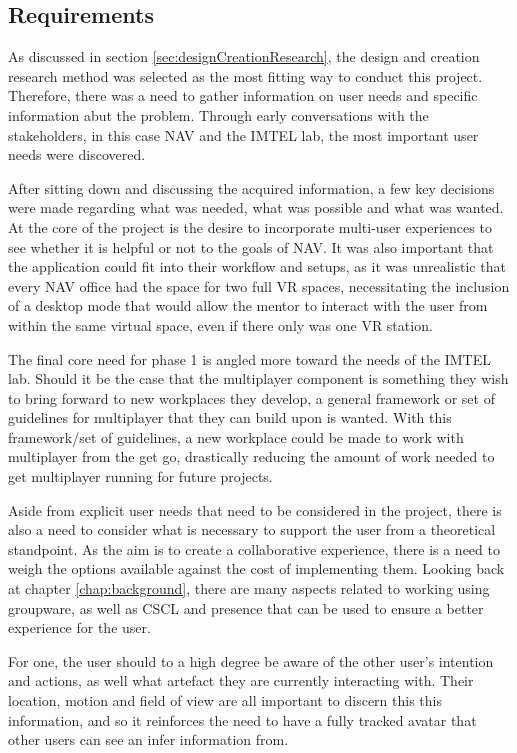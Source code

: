 \subsection{Requirements}
\label{section:phase1Requirements}
As discussed in section \ref{sec:designCreationResearch}, the design and creation research method was selected as the most fitting way to conduct this project. Therefore, there was a need to gather information on user needs and specific information abut the problem. Through early conversations with the stakeholders, in this case NAV and the IMTEL lab, the most important user needs were discovered. 

After sitting down and discussing the acquired information, a few key decisions were made regarding what was needed, what was possible and what was wanted.  At the core of the project is the desire to incorporate multi-user experiences to see whether it is helpful or not to the goals of NAV. It was also important that the application could fit into their workflow and setups, as it was unrealistic that every NAV office had the space for two full VR spaces, necessitating the inclusion of a desktop mode that would allow the mentor to interact with the user from within the same virtual space, even if there only was one VR station. 

The final core need for phase 1 is angled more toward the needs of the IMTEL lab. Should it be the case that the multiplayer component is something they wish to bring forward to new workplaces they develop, a general framework or set of guidelines for multiplayer that they can build upon is wanted. With this framework/set of guidelines, a new workplace could be made to work with multiplayer from the get go, drastically reducing the amount of work needed to get multiplayer running for future projects.

Aside from explicit user needs that need to be considered in the project, there is also a need to consider what is necessary to support the user from a theoretical standpoint. As the aim is to create a collaborative experience, there is a need to weigh the options available against the cost of implementing them. Looking back at chapter \ref{chap:background}, there are many aspects related to working using groupware, as well as CSCL and presence that can be used to ensure a better experience for the user.

For one, the user should to a high degree be aware of the other user's intention and actions, as well what artefact they are currently interacting with. Their location, motion and field of view are all important to discern this this information, and so it reinforces the need to have a fully tracked avatar that other users can see an infer information from.

